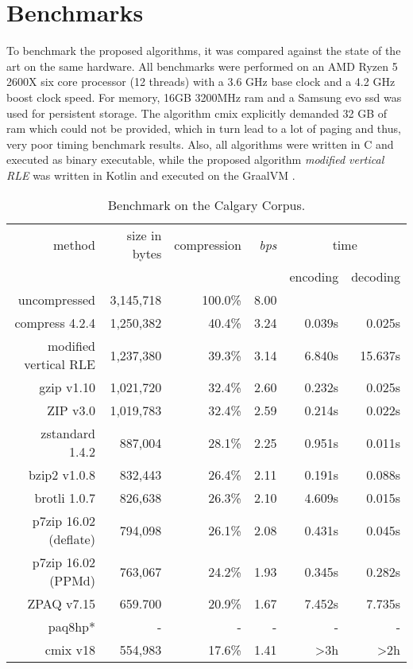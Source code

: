 \section{Benchmarks}
\label{ch:Evaluation:sec:Benchmarks}
\par{
	To benchmark the proposed algorithms, it was compared against the state of the art on the same hardware. All benchmarks were performed on an AMD Ryzen 5 2600X six core processor (12 threads) with a 3.6 GHz base clock and a 4.2 GHz boost clock speed. For memory, 16GB 3200MHz ram and a Samsung evo ssd was used for persistent storage. The algorithm cmix explicitly demanded 32 GB of ram which could not be provided, which in turn lead to a lot of paging and thus, very poor timing benchmark results. Also, all algorithms were written in C and executed as binary executable, while the proposed algorithm \emph{modified vertical RLE} was written in Kotlin and executed on the GraalVM \cite{vsipek2019exploring}.
}
	\begin{table}[h]
	\begin{tabular}{r|r|r|r|r|r}
		method  &  size in bytes & compression & \textit{bps} & \multicolumn{2}{c}{time }\\
		& & & & encoding & decoding\\
		\hline
		uncompressed & 3,145,718 & 100.0\% & 8.00 & &\\
		compress 4.2.4 & 1,250,382 & 40.4\% & 3.24 & 0.039s & 0.025s\\
		modified vertical RLE & 1,237,380 & 39.3\%& 3.14 & 6.840s & 15.637s\\
		gzip v1.10 & 1,021,720 & 32.4\% & 2.60 & 0.232s & 0.025s\\
		ZIP v3.0 & 1,019,783 & 32.4\% & 2.59 & 0.214s & 0.022s\\
		zstandard 1.4.2& 887,004 & 28.1\% & 2.25 & 0.951s & 0.011s\\
		bzip2 v1.0.8 & 832,443 & 26.4\% & 2.11 & 0.191s & 0.088s\\
		brotli 1.0.7 & 826,638 & 26.3\%& 2.10 & 4.609s & 0.015s\\
		p7zip 16.02 (deflate) &  794,098 & 26.1\% & 2.08 & 0.431s & 0.045s \\
		p7zip 16.02 (PPMd) &  763,067& 24.2\% & 1.93 & 0.345s & 0.282s\\
		ZPAQ v7.15 & 659.700 & 20.9\% & 1.67 & 7.452s & 7.735s\\
		paq8hp* & - & - & - & - & -\\ 
		cmix v18 & 554,983 & 17.6\% & 1.41 & >3h & >2h		
	\end{tabular}
	\label{tab:t100benchmark}
	\caption{Benchmark on the Calgary Corpus.}
\end{table}
